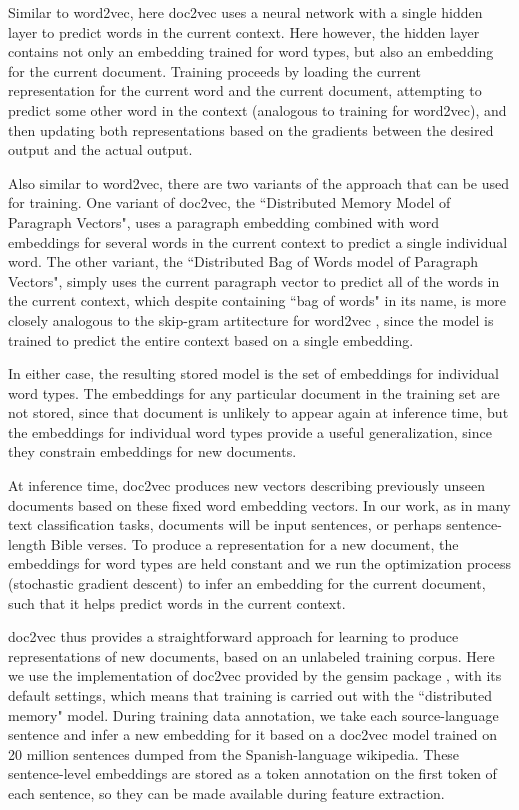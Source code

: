 Similar to word2vec, here doc2vec uses a neural network with a single hidden
layer to predict words in the current context. Here however, the hidden layer
contains not only an embedding trained for word types, but also an embedding
for the current document. Training proceeds by loading the current
representation for the current word and the current document, attempting to
predict some other word in the context (analogous to training for word2vec),
and then updating both representations based on the gradients between the
desired output and the actual output. 

Also similar to word2vec, there are two variants of the approach that can be
used for training. One variant of doc2vec, the ``Distributed Memory Model of
Paragraph Vectors", uses a paragraph embedding combined with word embeddings
for several words in the current context to predict a single individual word.
The other variant, the ``Distributed Bag of Words model of Paragraph Vectors",
simply uses the current paragraph vector to predict all of the words in the
current context, which despite containing ``bag of words" in its name, is more
closely analogous to the skip-gram artitecture for word2vec
\cite{quocle-distributed-representations-2014}, since the model is trained to
predict the entire context based on a single embedding.

In either case, the resulting stored model is the set of embeddings for
individual word types. The embeddings for any particular document in the
training set are not stored, since that document is unlikely to appear again at
inference time, but the embeddings for individual word types provide a useful
generalization, since they constrain embeddings for new documents.

At inference time, doc2vec produces new vectors describing previously unseen
documents based on these fixed word embedding vectors. In our work, as in many
text classification tasks, documents will be input sentences, or perhaps
sentence-length Bible verses. To produce a representation for a new document,
the embeddings for word types are held constant and we run the optimization
process (stochastic gradient descent) to infer an embedding for the current
document, such that it helps predict words in the current context.

doc2vec thus provides a straightforward approach for learning to produce
representations of new documents, based on an unlabeled training corpus. Here
we use the implementation of doc2vec provided by the gensim package
\cite{rehurek-lrec}, with its default settings, which means that training is
carried out with the ``distributed memory" model.
During training data annotation, we take each source-language sentence and
infer a new embedding for it based on a doc2vec model trained on 20 million
sentences dumped from the Spanish-language wikipedia. These sentence-level
embeddings are stored as a token annotation on the first token of each
sentence, so they can be made available during feature extraction.

